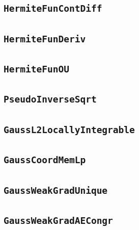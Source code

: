 \documentclass[11pt]{amsart}
\theoremstyle{definition}
\begin{document}
\subsection{\texorpdfstring{\texttt{HermiteFunContDiff}}{HermiteFunContDiff}}\label{node:HermiteFunContDiff}


\subsection{\texorpdfstring{\texttt{HermiteFunDeriv}}{HermiteFunDeriv}}\label{node:HermiteFunDeriv}


\subsection{\texorpdfstring{\texttt{HermiteFunOU}}{HermiteFunOU}}\label{node:HermiteFunOU}


\subsection{\texorpdfstring{\texttt{PseudoInverseSqrt}}{PseudoInverseSqrt}}\label{node:PseudoInverseSqrt}


\subsection{\texorpdfstring{\texttt{GaussL2LocallyIntegrable}}{GaussL2LocallyIntegrable}}\label{node:GaussL2LocallyIntegrable}


\subsection{\texorpdfstring{\texttt{GaussCoordMemLp}}{GaussCoordMemLp}}\label{node:GaussCoordMemLp}


\subsection{\texorpdfstring{\texttt{GaussWeakGradUnique}}{GaussWeakGradUnique}}\label{node:GaussWeakGradUnique}


\subsection{\texorpdfstring{\texttt{GaussWeakGradAECongr}}{GaussWeakGradAECongr}}\label{node:GaussWeakGradAECongr}

\end{document}
